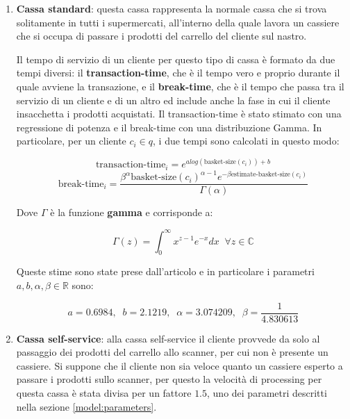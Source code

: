 \begin{enumerate}
\item \textbf{Cassa standard}: questa cassa rappresenta la normale cassa che si trova solitamente in tutti i supermercati, all'interno della quale lavora un cassiere che si occupa di passare i prodotti del carrello del cliente sul nastro.
 
Il tempo di servizio di un cliente per questo tipo di cassa è formato da due tempi diversi: il \textbf{transaction-time}, che è il tempo vero e proprio durante il quale avviene la transazione, e il \textbf{break-time}, che è il tempo che passa tra il servizio di un cliente e di un altro ed include anche la fase in cui il cliente insacchetta i prodotti acquistati. Il transaction-time è stato stimato con una regressione di potenza e il break-time con una distribuzione Gamma. In particolare, per un cliente $c_i \in q$, i due tempi sono calcolati in questo modo:

\begin{equation}\label{eq:transaction-time-standard}
\text{transaction-time}_i = e^{a log(\text{basket-size}(c_i)) + b}
\end{equation}
\begin{equation}\label{eq:break-time-standard}
\text{break-time}_i = \frac{\beta^{\alpha} \text{basket-size}(c_i)^{\alpha - 1} e^{- \beta \text{estimate-basket-size}(c_i)}}{\Gamma (\alpha)}
\end{equation}

Dove $\Gamma$ è la funzione \textbf{gamma} e corrisponde a:

\begin{equation}
\Gamma (z) = \int_{0}^{\infty} x^{z-1} e^{-x} dx \;\; \forall z \in \mathbb{C}
\end{equation}

Queste stime sono state prese dall'articolo \cite{article1} e in particolare i parametri $a,b,\alpha ,\beta \in \mathbb{R}$ sono:

\begin{equation}
a = 0.6984, \;\; b = 2.1219, \;\; \alpha = 3.074209, \;\; \beta = \frac{1}{4.830613}
\end{equation}

\item \textbf{Cassa self-service}: alla cassa self-service il cliente provvede da solo al passaggio dei prodotti del carrello allo scanner, per cui non è presente un cassiere. Si suppone che il cliente non sia veloce quanto un cassiere esperto a passare i prodotti sullo scanner, per questo la velocità di processing per questa cassa è stata divisa per un fattore $1.5$, uno dei parametri descritti nella sezione \ref{model:parameters}. 


\end{enumerate}
